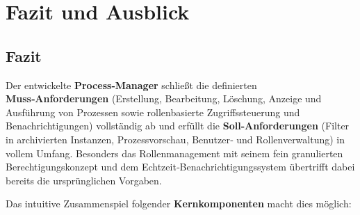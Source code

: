


\chapter{Fazit und Ausblick}
\section*{Fazit}


Der entwickelte \textbf{Process‑Manager} schließt die definierten \textbf{Muss‑Anforderungen} (Erstellung, Bearbeitung, Löschung, Anzeige und Ausführung von Prozessen sowie rollenbasierte Zugriffssteuerung und Benachrichtigungen) vollständig ab und erfüllt die \textbf{Soll‑Anforderungen} (Filter in archivierten Instanzen, Prozessvorschau, Benutzer‑ und Rollenverwaltung) in vollem Umfang. Besonders das Rollenmanagement mit seinem fein granulierten Berechtigungskonzept und dem Echtzeit‑Benachrichtigungssystem übertrifft dabei bereits die ursprünglichen Vorgaben.

Das intuitive Zusammenspiel folgender \textbf{Kernkomponenten} macht dies möglich:

